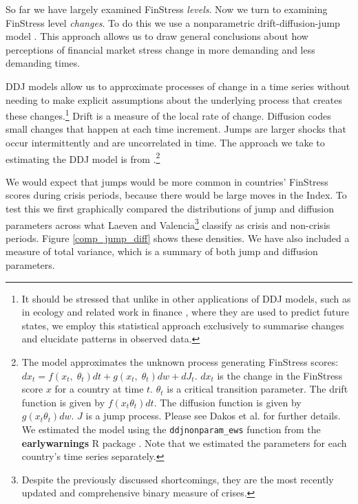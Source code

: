 \documentclass[]{article}
\begin{document}
So far we have largely examined FinStress \emph{levels}. Now we turn to examining  FinStress level \emph{changes}. To do this we use a nonparametric drift-diffusion-jump model \citep[DDJ,][]{Carpenter2011,Dakos2012}. This approach allows us to draw general conclusions about how perceptions of financial market stress change in more demanding and less demanding times.

DDJ models allow us to approximate processes of change in a time series without needing to make explicit assumptions about the underlying process that creates these changes.\footnote{It should be stressed that unlike in other applications of DDJ models, such as in ecology and related work in finance \citep{Kou2008}, where they are used to predict future states, we employ this statistical approach exclusively to summarise changes and elucidate patterns in observed data.} Drift is a measure of the local rate of change. Diffusion codes small changes that happen at each time increment. Jumps are larger shocks that occur intermittently and are uncorrelated in time. The approach we take to estimating the DDJ model is from \cite{Carpenter2011}.\footnote{The model approximates the unknown process generating FinStress scores: $dx_{t} = f(x_{t},\;\theta_{t})dt + g(x_{t},\;\theta_{t})dw + dJ_{t}$. $dx_{t}$ is the change in the FinStress score $x$ for a country at time $t$. $\theta_{t}$ is a critical transition parameter. The drift function is given by $f(x_{t}\theta_{t})dt$. The diffusion function is given by $g(x_{t}\theta_{t})dw$. $J$ is a jump process. Please see Dakos et al. \citeyearpar[7]{Dakos2012} for further details. We estimated the model using the \texttt{ddjnonparam\_ews} function from the \textbf{earlywarnings} R package \citep{earlywarnings2013}. Note that we estimated the parameters for each country's time series separately.}

We would expect that jumps would be more common in countries' FinStress scores during crisis periods, because there would be large moves in the Index. To test this we first graphically compared the distributions of jump and diffusion parameters across what Laeven and Valencia\footnote{Despite the previously discussed shortcomings, they are the most recently updated and comprehensive binary measure of crises.} classify as crisis and non-crisis periods. Figure \ref{comp_jump_diff} shows these densities. We have also included a measure of total variance, which is a summary of both jump and diffusion parameters.
\end{document}
